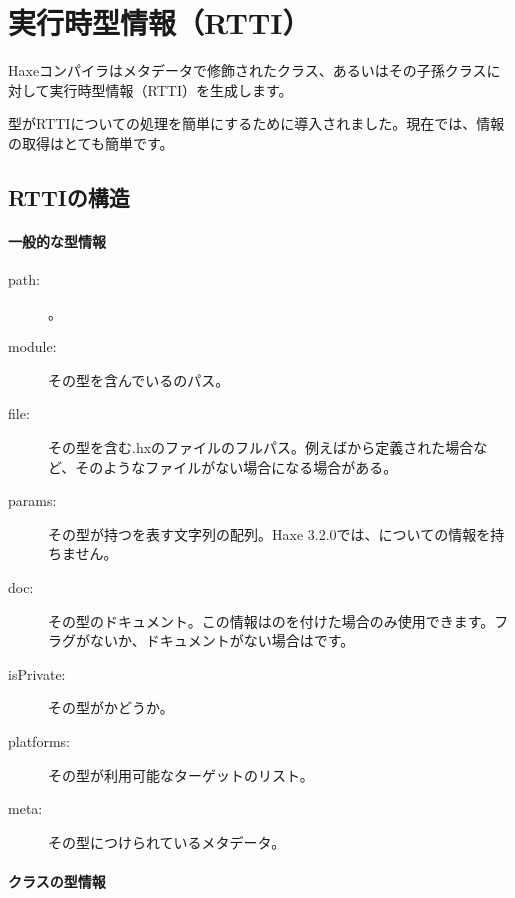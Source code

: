 \section{実行時型情報（RTTI）}
\label{cr-rtti}

Haxeコンパイラはメタデータで修飾されたクラス、あるいはその子孫クラスに対して実行時型情報（RTTI）を生成します。


型がRTTIについての処理を簡単にするために導入されました。現在では、情報の取得はとても簡単です。


\subsection{RTTIの構造}
\label{cr-rtti-structure}

\paragraph{一般的な型情報}

\begin{description}
	\item[path:] 。
	\item[module:] その型を含んでいるのパス。
	\item[file:] その型を含む.hxのファイルのフルパス。例えばから定義された場合など、そのようなファイルがない場合になる場合がある。
	\item[params:] その型が持つを表す文字列の配列。Haxe 3.2.0では、についての情報を持ちません。
	\item[doc:] その型のドキュメント。この情報はのを付けた場合のみ使用できます。フラグがないか、ドキュメントがない場合はです。
	\item[isPrivate:] その型がかどうか。
	\item[platforms:] その型が利用可能なターゲットのリスト。
	\item[meta:] その型につけられているメタデータ。
\end{description}
	
\paragraph{クラスの型情報}
\label{cr-rtti-class-type-information}

